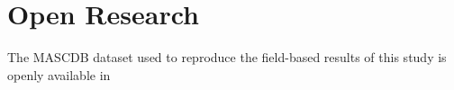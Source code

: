 \documentclass[draft]{agujournal2019}
\begin{document}
%
%



%
%
%
%






\section{Open Research}
The MASCDB dataset used to reproduce the field-based results of this study is openly available in~
\end{document}
